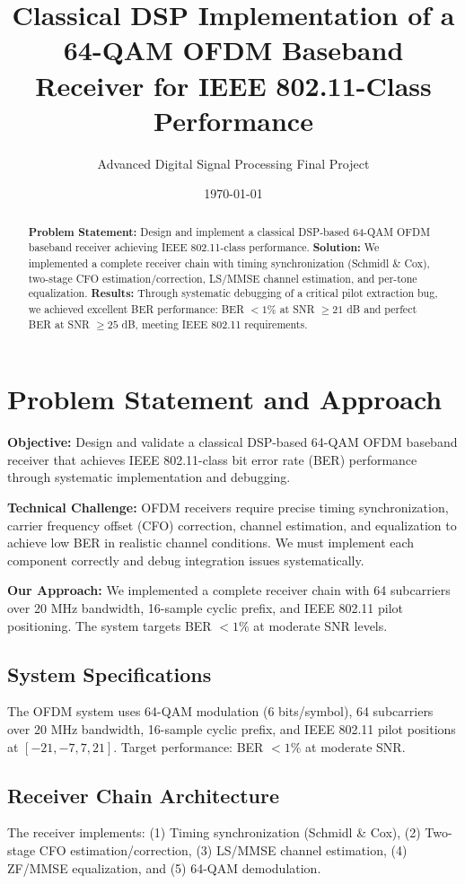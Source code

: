 \documentclass[11pt,a4paper]{article}
\title{\textbf{Classical DSP Implementation of a 64-QAM OFDM Baseband Receiver for IEEE 802.11-Class Performance}}
\author{Advanced Digital Signal Processing Final Project}
\date{\today}
\begin{document}
\maketitle

\begin{abstract}
\textbf{Problem Statement:} Design and implement a classical DSP-based 64-QAM OFDM baseband receiver achieving IEEE 802.11-class performance. \textbf{Solution:} We implemented a complete receiver chain with timing synchronization (Schmidl \& Cox), two-stage CFO estimation/correction, LS/MMSE channel estimation, and per-tone equalization. \textbf{Results:} Through systematic debugging of a critical pilot extraction bug, we achieved excellent BER performance: BER $< 1\%$ at SNR $\geq 21$ dB and perfect BER at SNR $\geq 25$ dB, meeting IEEE 802.11 requirements.
\end{abstract}

\section{Problem Statement and Approach}

\textbf{Objective:} Design and validate a classical DSP-based 64-QAM OFDM baseband receiver that achieves IEEE 802.11-class bit error rate (BER) performance through systematic implementation and debugging.

\textbf{Technical Challenge:} OFDM receivers require precise timing synchronization, carrier frequency offset (CFO) correction, channel estimation, and equalization to achieve low BER in realistic channel conditions. We must implement each component correctly and debug integration issues systematically.

\textbf{Our Approach:} We implemented a complete receiver chain with 64 subcarriers over 20 MHz bandwidth, 16-sample cyclic prefix, and IEEE 802.11 pilot positioning. The system targets BER $< 1\%$ at moderate SNR levels.

\subsection{System Specifications}
The OFDM system uses 64-QAM modulation (6 bits/symbol), 64 subcarriers over 20 MHz bandwidth, 16-sample cyclic prefix, and IEEE 802.11 pilot positions at $[-21, -7, 7, 21]$. Target performance: BER $< 1\%$ at moderate SNR.

\subsection{Receiver Chain Architecture}
The receiver implements: (1) Timing synchronization (Schmidl \& Cox), (2) Two-stage CFO estimation/correction, (3) LS/MMSE channel estimation, (4) ZF/MMSE equalization, and (5) 64-QAM demodulation.
\end{document}
